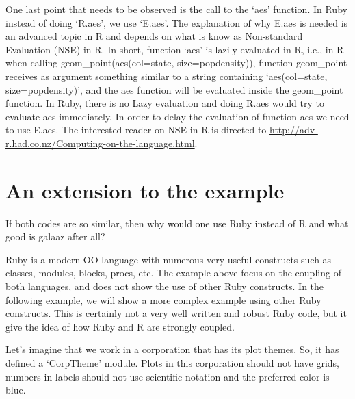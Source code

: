 \documentclass[11pt,]{article}
\begin{document}
One last point that needs to be observed is the call to the `aes'
function. In Ruby instead of doing `R.aes', we use `E.aes'. The
explanation of why E.aes is needed is an advanced topic in R and depends
on what is know as Non-standard Evaluation (NSE) in R. In short,
function `aes' is lazily evaluated in R, i.e., in R when calling
geom\_point(aes(col=state, size=popdensity)), function geom\_point
receives as argument something similar to a string containing
`aes(col=state, size=popdensity)', and the aes function will be
evaluated inside the geom\_point function. In Ruby, there is no Lazy
evaluation and doing R.aes would try to evaluate aes immediately. In
order to delay the evaluation of function aes we need to use E.aes. The
interested reader on NSE in R is directed to
\url{http://adv-r.had.co.nz/Computing-on-the-language.html}.

\section{An extension to the example}\label{an-extension-to-the-example}

If both codes are so similar, then why would one use Ruby instead of R
and what good is galaaz after all?

Ruby is a modern OO language with numerous very useful constructs such
as classes, modules, blocks, procs, etc. The example above focus on the
coupling of both languages, and does not show the use of other Ruby
constructs. In the following example, we will show a more complex
example using other Ruby constructs. This is certainly not a very well
written and robust Ruby code, but it give the idea of how Ruby and R are
strongly coupled.

Let's imagine that we work in a corporation that has its plot themes.
So, it has defined a `CorpTheme' module. Plots in this corporation
should not have grids, numbers in labels should not use scientific
notation and the preferred color is blue.
\end{document}
